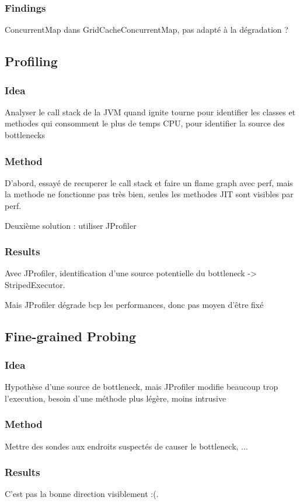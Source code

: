 \documentclass[conference]{IEEEtran}
\begin{document}
\subsubsection{Findings}
ConcurrentMap dans GridCacheConcurrentMap, pas adapté à la dégradation ?

\subsection{Profiling}
\subsubsection{Idea}
Analyser le call stack de la JVM quand ignite tourne pour identifier les classes et methodes qui consomment le plus de temps CPU, pour identifier la source des bottlenecks
\subsubsection{Method}
D'abord, essayé de recuperer le call stack et faire un flame graph avec perf, mais la methode ne fonctionne pas très bien, seules les methodes JIT sont visibles par perf.

Deuxième solution : utiliser JProfiler
\subsubsection{Results}
Avec JProfiler, identification d'une source potentielle du bottleneck -> StripedExecutor.

Mais JProfiler dégrade bcp les performances, donc pas moyen d'être fixé

\subsection{Fine-grained Probing}
\subsubsection{Idea}
Hypothèse d'une source de bottleneck, mais JProfiler modifie beaucoup trop l'execution, besoin d'une méthode plus légère, moins intrusive

\subsubsection{Method}
Mettre des sondes aux endroits suspectés de causer le bottleneck, ...
\subsubsection{Results}
C'est pas la bonne direction visiblement :(.
\end{document}
